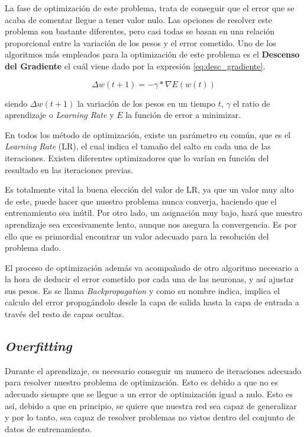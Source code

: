La fase de optimización de este problema, trata de conseguir que el error que se acaba de comentar llegue a tener valor nulo. Las opciones de resolver este problema son bastante diferentes, pero casi todas se basan en una relación proporcional entre la variación de los pesos y el error cometido. Uno de los algoritmos más empleados para la optimización de este problema es el \textbf{Descenso del Gradiente} el cuál viene dado por la expresión \ref{eq:desc_gradiente}.

\begin{equation}
    \Delta w(t+1)= -\gamma * \nabla E(w(t))
    \label{eq:desc_gradiente}
\end{equation}

siendo $\Delta w(t+1)$ la variación de los pesos en un tiempo $t$, $\gamma$ el ratio de aprendizaje o \textit{Learning Rate} y $E$ la función de error a minimizar.

En todos los método de optimización, existe un parámetro en común, que es el \textit{Learning Rate} (LR), el cual indica el tamaño del salto en cada una de las iteraciones. Existen diferentes optimizadores que lo varían en función del resultado en las iteraciones previas.

Es totalmente vital la buena elección del valor de LR, ya que un valor muy alto de este, puede hacer que nuestro problema nunca converja, haciendo que el entrenamiento sea inútil. Por otro lado, un asignación muy bajo, hará que nuestro aprendizaje sea excesivamente lento, aunque nos asegura la convergencia. Es por ello que es primordial encontrar un valor adecuado para la resolución del problema dado.

El proceso de optimización además va acompañado de otro algoritmo necesario a la hora de deducir el error cometido por cada una de las neuronas, y así ajustar sus pesos. Es se llama \textit{Backpropagation} \cite{Goodfellow-et-al-2016} y como su nombre indica, implica el calculo del error propagándolo desde la capa de salida hasta la capa de entrada a través del resto de capas ocultas.

\subsection{\textit{Overfitting}}

Durante el aprendizaje, es necesario conseguir un numero de iteraciones adecuado para resolver nuestro problema de optimización. Esto es debido a que no es adecuado siempre que se llegue a un error de optimización igual a nulo. Esto es así, debido a que en principio, se quiere que nuestra red sea capaz de generalizar y por lo tanto, sea capaz de resolver problemas no vistos dentro del conjunto de datos de entrenamiento.

